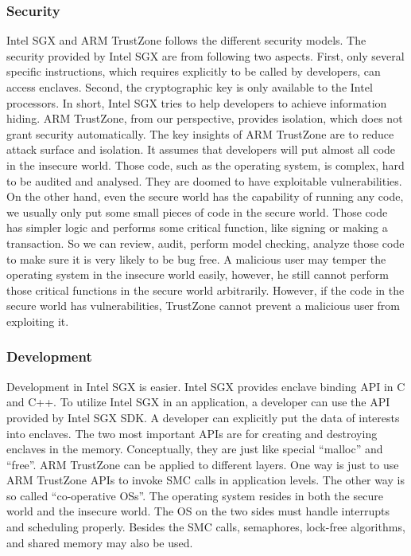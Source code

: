 \subsubsection{Security}
Intel SGX and ARM TrustZone follows the different security models.
The security provided by Intel SGX are from following two aspects.
First, only several specific instructions, which requires explicitly 
to be called by developers, can access enclaves. Second, the 
cryptographic key is only available to the Intel processors. In short,
Intel SGX tries to help developers to achieve information hiding.
ARM TrustZone, from our perspective, provides isolation, which does
not grant security automatically. The key insights of ARM TrustZone are to
reduce attack surface and isolation. It assumes that developers will 
put almost all code in the insecure world. Those code, such as the 
operating system, is complex, hard to be audited and analysed. They are 
doomed to have exploitable vulnerabilities. On the other hand, even the 
secure world has the capability of running any code, we usually only put 
some small pieces of code in the secure world. Those code has simpler 
logic and performs some critical function, like signing or making a transaction.
So we can review, audit, perform model checking, analyze those code
to make sure it is very likely to be bug free. A malicious user
may temper the operating system in the insecure world easily, however,
he still cannot perform those critical functions in the secure world 
arbitrarily. However, if the code in the secure world has vulnerabilities,
TrustZone cannot prevent a malicious user from exploiting it.             




\subsubsection{Development}
Development in Intel SGX is easier. Intel SGX provides enclave 
binding API in C and C++. To utilize Intel SGX in an application,
a developer can use the API provided by Intel SGX SDK. A developer
can explicitly put the data of interests into enclaves. 
The two most important APIs are for creating and destroying enclaves 
in the memory. Conceptually, they are just like special ``malloc''
and ``free''. ARM TrustZone can be applied to different layers. 
One way is just to use ARM TrustZone APIs to invoke SMC calls in 
application levels. The other way is so called ``co-operative OSs''.
The operating system resides in both the secure world and the 
insecure world. The OS on the two sides must handle interrupts and
scheduling properly. Besides the SMC calls, semaphores, lock-free
algorithms, and shared memory may also be used.       
  

